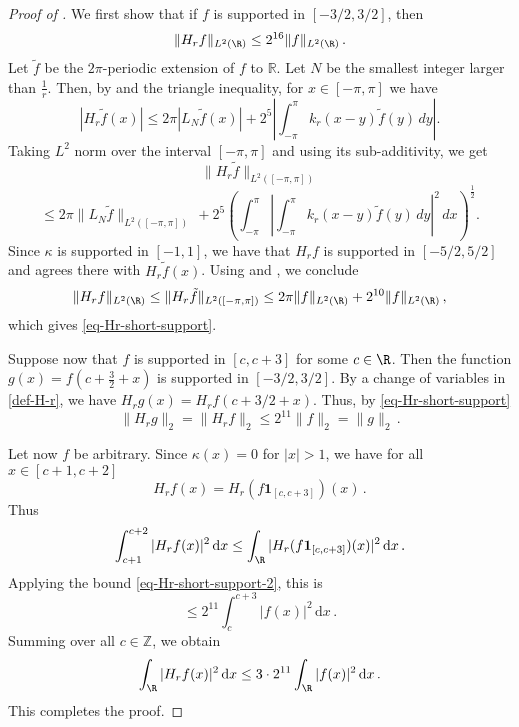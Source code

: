 \begin{proof}[Proof of ]
    We first show that if $f$ is supported in $[-3/2, 3/2]$, then
    \begin{equation}
        \label{eq-Hr-short-support}
        \|H_r f\|_{L^2(\R)} \le 2^{16} \|f\|_{L^2(\R)}\,.
    \end{equation}
    Let $\tilde{f}$ be the $2\pi$-periodic extension of $f$ to $\mathbb{R}$. Let $N$ be the smallest
    integer larger than $\frac 1r$. Then, by  and the triangle inequality, for $x\in [-\pi, \pi]$ we have
    \begin{equation*}
        |H_r \tilde{f}(x)|\leq 2\pi |L_N \tilde{f}(x)|+2^{5}\left|\int_{-\pi}^{\pi}k_r(x-y)\tilde{f}(y)\, dy\right|.
    \end{equation*}
    Taking $L^2$ norm over the interval $[-\pi, \pi]$ and using its sub-additivity, we get
    $$
         \|H_r \tilde{f}\|_{L^2([-\pi, \pi])}
    $$
    \begin{equation*}
       \leq 2\pi \|L_N \tilde{f}\|_{L^2([-\pi, \pi])}\, + 2^{5}\left(\int_{-\pi}^{\pi} \left|\int_{-\pi}^{\pi}k_r(x-y)\tilde{f}(y)\, dy\right|^2\, dx\right)^{\frac{1}{2}}.
    \end{equation*}
    Since $\kappa$ is supported in $[-1,1]$, we have that $H_rf$ is supported in $[-5/2, 5/2]$ and agrees there with $H_r \tilde f(x)$.
    Using  and , we conclude
    \begin{equation}
        \|H_r f\|_{L^2(\R)} \le \|H_r \tilde f\|_{L^2([-\pi, \pi])} \leq 2\pi \|f\|_{L^2(\R)} + 2^{10}\|f\|_{L^2(\R)}\,,
    \end{equation}
    which gives \eqref{eq-Hr-short-support}.

    Suppose now that $f$ is supported in $[c, c+3]$ for some $c \in \R$. Then the function $g(x) = f(c+ \frac{3}{2} +x)$ is supported in $[-3/2,3/2]$. By a change of variables in \eqref{def-H-r}, we have $H_r g(x ) = H_r f(c+ 3/2+x)$. Thus, by \eqref{eq-Hr-short-support}
    \begin{equation}
        \label{eq-Hr-short-support-2}
        \|H_rg\|_2 = \|H_r f\|_2 \le 2^{11} \|f\|_2 = \|g\|_2\,.
    \end{equation}

    Let now $f$ be arbitrary.
    Since $\kappa(x) = 0$ for $|x| > 1$, we have for all $x \in [c+1, c+2]$
    $$
        H_rf(x) = H_r(f \mathbf{1}_{[c, c+3]})(x)\,.
    $$
    Thus
    $$
        \int_{c+1}^{c+2} |H_r f(x)|^2 \, \mathrm{d}x \le \int_{\R} |H_r(f \mathbf{1}_{[c, c+3]})(x)|^2 \, \mathrm{d}x\,.
    $$
    Applying the bound \eqref{eq-Hr-short-support-2}, this is
    $$
        \le 2^{11} \int_{c}^{c+3} |f(x)|^2 \, \mathrm{d}x\,.
    $$
    Summing over all $c \in \mathbb{Z}$, we obtain
    $$
        \int_{\R} |H_rf(x)|^2 \, \mathrm{d}x \le 3 \cdot 2^{11} \int_{\R} |f(x)|^2 \, \mathrm{d}x\,.
    $$
    This completes the proof.
\end{proof}







